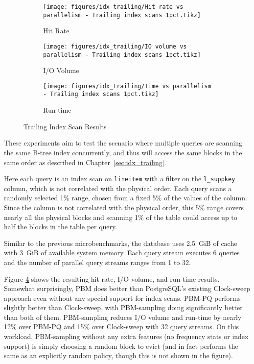 \begin{figure}
\centering
    \begin{subfigure}{0.45\textwidth}
        \centering
        \texttt{[image: figures/idx\_trailing/Hit rate vs parallelism - Trailing index scans 1pct.tikz]}
        \caption{Hit Rate}
        \label{fig:idx_trailing_hitrate}
    \end{subfigure}\hspace{0.05\textwidth}%
    \begin{subfigure}{0.45\textwidth}
        \centering
        \texttt{[image: figures/idx\_trailing/IO volume vs parallelism - Trailing index scans 1pct.tikz]}
        \caption{I/O Volume}
        \label{fig:idx_trailing_iovol}
    \end{subfigure}
    
\vspace{20pt}
    \begin{subfigure}{0.45\textwidth}
        \centering
        \texttt{[image: figures/idx\_trailing/Time vs parallelism - Trailing index scans 1pct.tikz]}
        \caption{Run-time}
        \label{fig:idx_trailing_runtime}
    \end{subfigure}
    \caption{Trailing Index Scan Results}
    \label{fig:idx_trailing}
\end{figure}


These experiments aim to test the scenario where multiple queries are scanning the same B-tree index concurrently, and thus will access the same blocks in the same order as described in Chapter~\ref{sec:idx_trailing}.

Here each query is an index scan on \verb|lineitem| with a filter on the \verb|l_suppkey| column, which is not correlated with the physical order. Each query scans a randomly selected 1\% range, chosen from a fixed 5\% of the values of the column. Since the column is not correlated with the physical order, this 5\% range covers nearly all the physical blocks and scanning 1\% of the table could access up to half the blocks in the table per query.

Similar to the previous microbenchmarks, the database uses 2.5~GiB of cache with 3~GiB of available system memory. Each query stream executes 6 queries and the number of parallel query streams ranges from 1 to 32.


Figure \ref{fig:idx_trailing} shows the resulting hit rate, I/O volume, and run-time results. Somewhat surprisingly, PBM does better than PostgreSQL's existing Clock-sweep approach even without any special support for index scans. PBM-PQ performs slightly better than Clock-sweep, with PBM-sampling doing significantly better than both of them. PBM-sampling reduces I/O volume and run-time by nearly 12\% over PBM-PQ and 15\% over Clock-sweep with 32 query streams. On this workload, PBM-sampling without any extra features (no frequency stats or index support) is simply choosing a random block to evict (and in fact performs the same as an explicitly random policy, though this is not shown in the figure). 


